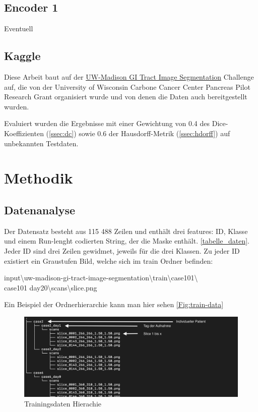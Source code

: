 \subsection{Encoder 1}
Eventuell

\subsection{Kaggle}

Diese Arbeit baut auf der 
\href{https://www.kaggle.com/competitions/uw-madison-gi-tract-image-segmentation/overview/description}{UW-Madison GI Tract Image Segmentation}
Challenge auf, die von der \glqq University of Wisconsin Carbone Cancer Center Pancreas Pilot Research Grant \grqq organisiert wurde und von denen die Daten auch bereitgestellt wurden.

Evaluiert wurden die Ergebnisse mit einer Gewichtung von 0.4 des Dice-Koeffizienten  (\autoref{ssec:dc}) sowie 0.6 der Hausdorff-Metrik (\autoref{ssec:hdorff}) auf unbekannten Testdaten.


\section{Methodik}\raggedbottom

\subsection{Datenanalyse}
Der Datensatz besteht aus 115 488 Zeilen und enthält drei features: ID, Klasse und einem Run-lenght codierten String, der die Maske enthält. \autoref{tabelle_daten}. Jeder ID sind drei Zeilen gewidmet, jeweils für die drei Klassen. Zu jeder ID existiert ein Graustufen Bild, welche sich im train Ordner befinden:

input\textbackslash uw-madison-gi-tract-image-segmentation\textbackslash train\textbackslash case101\textbackslash \\case101\textunderscore
day20\textbackslash scans\textbackslash slice.png

Ein Beispiel der Ordnerhierarchie kann man hier sehen \autoref{Fig:train-data}

\begin{figure}[htb]
	\begin{center}
		\includegraphics[width=450pt]{bilder/data_tree}
		\caption{Trainingsdaten Hierachie}\label{Fig:train-data}
	\end{center}
\end{figure}

